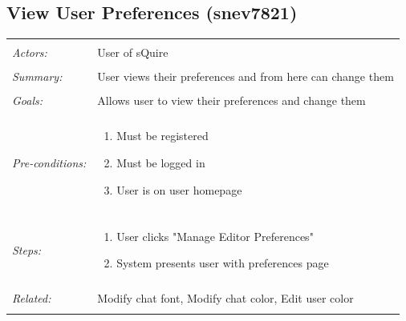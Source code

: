 \documentclass[11pt]{report}
\begin{document}
\subsection{View User Preferences (snev7821)}
\begin{tabular}{ p{2cm} p{12cm} }
\hline
\\
    \textit{Actors:} & User of sQuire \\
	\\
	\textit{Summary:} & User views their preferences and from here can change them \\
	\\
	\textit{Goals:} & Allows user to view their preferences and change them \\
	\\
	\textit{Pre-conditions:} & \begin{enumerate}
		\item Must be registered
		\item Must be logged in
		\item User is on user homepage
	\end{enumerate} \\
	\\
	\textit{Steps:} & \begin{enumerate}
		\item User clicks "Manage Editor Preferences"
		\item System presents user with preferences page
	\end{enumerate} \\
	\\
	\textit{Related:} & Modify chat font, Modify chat color, Edit user color \\
	\\
\hline
\end{tabular}
\newpage
\end{document}
